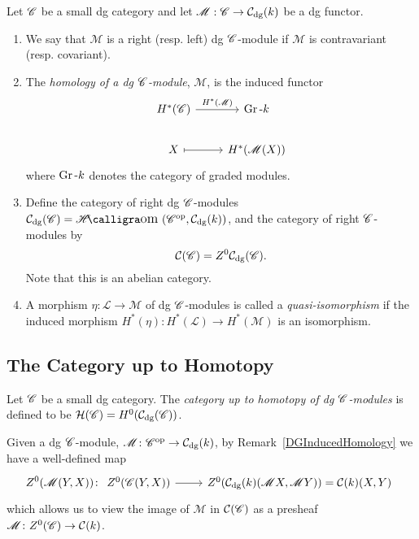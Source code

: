 \documentclass[dissertation.tex]{subfiles}
\begin{document}
\begin{defn}
  Let $\mathscr{C}$ be a small dg category and let $\mathscr{M} : \mathscr{C} \rightarrow \mathcal{C}_\text{dg}(k)$ be a dg functor.
  \begin{enumerate}
  \item
    We say that $\mathscr{M}$ is a right (resp. left) dg $\mathscr{C}$-module if $\mathscr{M}$ is contravariant (resp. covariant).
  \item
    The {\it homology of a dg $\mathscr{C}$-module}, $\mathscr{M}$, is the induced functor
    $$\begin{tikzcd}
      H^\ast(\CC) \arrow{r}{H^\ast(\mathscr{M})}& \Gr{k}\\
      X \arrow[mapsto]{r} & H^\ast(\mathscr{M}(X))
    \end{tikzcd}$$
    where $\operatorname{Gr}\text{-}k$ denotes the category of graded modules.
  \item
    Define the category of right dg $\mathscr{C}$-modules $\mathcal{C}_\text{dg}(\CC) = \SHom{\CC^\text{op}, \mathcal{C}_\text{dg}(k)}$, and the category of right $\mathscr{C}$-modules by
    $$\mathcal{C}(\mathscr{C}) = Z^0 \mathcal{C}_\text{dg}(\mathscr{C}).$$
    Note that this is an abelian category.
    \item
      A morphism $\eta \colon \mathscr{L} \rightarrow \mathscr{M}$ of dg $\mathscr{C}$-modules is called a {\it quasi-isomorphism} if the induced morphism $H^\ast(\eta) \colon H^\ast(\mathscr{L}) \rightarrow H^\ast(\mathscr{M})$ is an isomorphism.
  \end{enumerate}
\end{defn}

\subsection{The Category up to Homotopy}
\begin{defn}
    Let $\mathscr{C}$ be a small dg category.
    The {\it category up to homotopy of dg $\mathscr{C}$-modules} is defined to be $\mathcal{H}(\mathscr{C}) = H^0(\mathcal{C}_\text{dg}(\mathscr{C}))$.
\end{defn}

Given a dg $\mathscr{C}$-module, $\mathscr{M} \colon \mathscr{C}^\text{op} \rightarrow \mathcal{C}_\text{dg}(k)$, by Remark~\ref{DGInducedHomology} we have a well-defined map
$$Z^0(\mathscr{M}(Y,X)) \colon
\begin{tikzcd}
  Z^0(\CC(Y,X)) \arrow{r} & Z^0(\mathcal{C}_\text{dg}(k)(\mathscr{M}X,\mathscr{M}Y)) = \mathcal{C}(k)(X,Y)
\end{tikzcd}$$
which allows us to view the image of $\mathscr{M}$ in $\mathcal{C}(\mathscr{C})$ as a presheaf $\mathscr{M} \colon Z^0(\mathscr{C}) \to \mathcal{C}(k)$.
\end{document}
